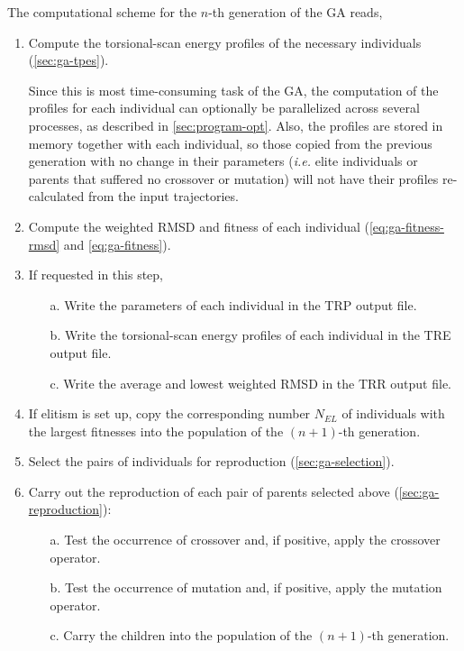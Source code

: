 \documentclass[10pt,a4paper,openany]{memoir}
\numberwithin{equation}{section}
\newcommand{\revyan}[1]{{\color{red}{[#1]}}}
\begin{document}
The computational scheme for the $n$-th generation of the GA reads,
\begin{enumerate}
\item Compute the torsional-scan energy profiles of the necessary individuals (\autoref{sec:ga-tpes}).
  \par
  Since this is most time-consuming task of the GA, the computation of
  the profiles for each individual can optionally be parallelized
  across several processes, as described in
  \autoref{sec:program-opt}. Also, the profiles are stored in memory
  together with each individual, so those copied from the previous
  generation with no change in their parameters (\textit{i.e.} elite
  individuals or parents that suffered no crossover or mutation) will
  not have their profiles re-calculated from the input trajectories.

\item Compute the weighted RMSD and fitness of each individual
  (\autoref{eq:ga-fitness-rmsd} and \autoref{eq:ga-fitness}).
\item If requested in this step,
  \begin{enumerate}
  \item[a.]  Write the parameters of each individual in the TRP output file.
  \item [b.] Write the torsional-scan energy profiles of each individual in the TRE output file.
  \item [c.] Write the average and lowest weighted RMSD in the TRR output file.
  \end{enumerate}
\item If elitism is set up, copy the corresponding number $N_{EL}$ of individuals  with the largest fitnesses into the population of the $(n+1)$-th generation.
\item Select the pairs of individuals for reproduction (\autoref{sec:ga-selection}).
\item Carry out the reproduction of each pair of parents selected above (\autoref{sec:ga-reproduction}):
  \begin{enumerate}
  \item[a.] Test the occurrence of crossover and, if positive, apply the crossover operator.
  \item[b.] Test the occurrence of mutation and, if positive, apply the mutation operator.
  \item[c.] Carry the children into the population of the $(n+1)$-th generation.
  \end{enumerate}
\end{enumerate}
\end{document}

